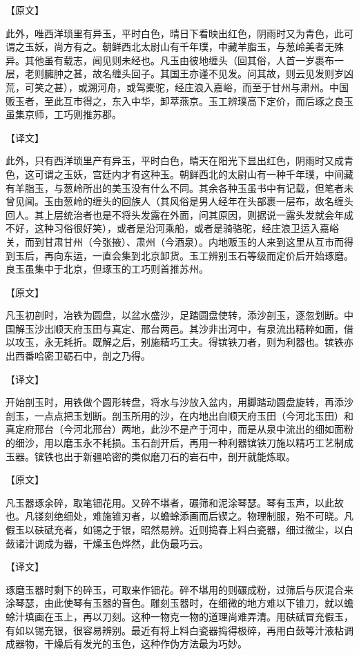 \documentclass[12pt,UTF8]{ctexbook}
\begin{document}
【原文】

此外，唯西洋琐里有异玉，平时白色，晴日下看映出红色，阴雨时又为青色，此可谓之玉妖，尚方有之。朝鲜西北太尉山有千年璞，中藏羊脂玉，与葱岭美者无殊异。其他虽有载志，闻见则未经也。凡玉由彼地缠头（回其俗，人首一岁裹布一层，老则臃肿之甚，故名缠头回子。其国王亦谨不见发。问其故，则云见发则岁凶荒，可笑之甚），或溯河舟，或驾橐驼，经庄浪入嘉峪，而至于甘州与肃州。中国贩玉者，至此互市得之，东入中华，卸萃燕京。玉工辨璞高下定价，而后琢之良玉虽集京师，工巧则推苏郡。

【译文】

此外，只有西洋琐里产有异玉，平时白色，晴天在阳光下显出红色，阴雨时又成青色，这可谓之玉妖，宫廷内才有这种玉。朝鲜西北的太尉山有一种千年璞，中间藏有羊脂玉，与葱岭所出的美玉没有什么不同。其余各种玉虽书中有记载，但笔者未曾见闻。玉由葱岭的缠头的回族人（其风俗是男人经年在头部裹一层布，故名缠头回人。其上层统治者也是不将头发露在外面，问其原因，则据说一露头发就会年成不好，这种习俗很好笑），或者是沿河乘船，或者是骑骆驼，经庄浪卫运入嘉峪关，而到甘肃甘州（今张掖）、肃州（今酒泉）。内地贩玉的人来到这里从互市而得到玉后，再向东运，一直会集到北京卸货。玉工辨别玉石等级而定价后开始琢磨。良玉虽集中于北京，但琢玉的工巧则首推苏州。

【原文】

凡玉初剖时，冶铁为圆盘，以盆水盛沙，足踏圆盘使转，添沙剖玉，逐忽划断。中国解玉沙出顺天府玉田与真定、邢台两邑。其沙非出河中，有泉流出精粹如面，借以攻玉，永无耗折。既解之后，别施精巧工夫。得镔铁刀者，则为利器也。镔铁亦出西番哈密卫砺石中，剖之乃得。

【译文】

开始剖玉时，用铁做个圆形转盘，将水与沙放入盆内，用脚踏动圆盘旋转，再添沙剖玉，一点点把玉划断。剖玉所用的沙，在内地出自顺天府玉田（今河北玉田）和真定府邢台（今河北邢台）两地，此沙不是产于河中，而是从泉中流出的细如面粉的细沙，用以磨玉永不耗损。玉石剖开后，再用一种利器镔铁刀施以精巧工艺制成玉器。镔铁也出于新疆哈密的类似磨刀石的岩石中，剖开就能炼取。

【原文】

凡玉器琢余碎，取笔钿花用。又碎不堪者，碾筛和泥涂琴瑟。琴有玉声，以此故也。凡镂刻绝细处，难施锥刃者，以蟾蜍添画而后锲之。物理制服，殆不可晓。凡假玉以砆碔充者，如锡之于银，昭然易辨。近则捣舂上料白瓷器，细过微尘，以白蔹诸汁调成为器，干燥玉色烨然，此伪最巧云。

【译文】

琢磨玉器时剩下的碎玉，可取来作钿花。碎不堪用的则碾成粉，过筛后与灰混合来涂琴瑟，由此使琴有玉器的音色。雕刻玉器时，在细微的地方难以下锥刀，就以蟾蜍汁填画在玉上，再以刀刻。这种一物克一物的道理尚难弄清。用砆碔冒充假玉，有如以锡充银，很容易辨别。最近有将上料白瓷器捣得极碎，再用白蔹等汁液粘调成器物，干燥后有发光的玉色，这种作伪方法最为巧妙。
\end{document}
